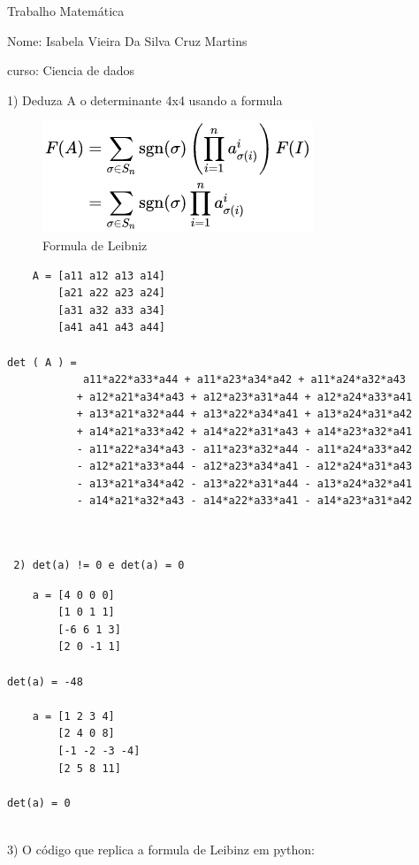 \documentclass{article}
\begin{document}
Trabalho Matemática

Nome: Isabela Vieira Da Silva Cruz Martins

curso: Ciencia de dados


1) Deduza A o determinante 4x4 usando a formula
\begin{figure}[h]
    \centering
    \includegraphics{Formula.png}
    \caption{Formula de Leibniz}
    \label{fig:exemplo}
\end{figure}

\begin{lstlisting}
    A = [a11 a12 a13 a14]
        [a21 a22 a23 a24]
        [a31 a32 a33 a34]
        [a41 a41 a43 a44]

det ( A ) =
            a11*a22*a33*a44 + a11*a23*a34*a42 + a11*a24*a32*a43
           + a12*a21*a34*a43 + a12*a23*a31*a44 + a12*a24*a33*a41
           + a13*a21*a32*a44 + a13*a22*a34*a41 + a13*a24*a31*a42
           + a14*a21*a33*a42 + a14*a22*a31*a43 + a14*a23*a32*a41
           - a11*a22*a34*a43 - a11*a23*a32*a44 - a11*a24*a33*a42
           - a12*a21*a33*a44 - a12*a23*a34*a41 - a12*a24*a31*a43
           - a13*a21*a34*a42 - a13*a22*a31*a44 - a13*a24*a32*a41
           - a14*a21*a32*a43 - a14*a22*a33*a41 - a14*a23*a31*a42
       
        
\end{lstlisting}
\begin{lstlisting}
 2) det(a) != 0 e det(a) = 0 
\end{lstlisting} 

\begin{lstlisting}
    a = [4 0 0 0]
        [1 0 1 1]
        [-6 6 1 3]
        [2 0 -1 1]

det(a) = -48

    a = [1 2 3 4]
        [2 4 0 8]
        [-1 -2 -3 -4]
        [2 5 8 11]

det(a) = 0        
        
\end{lstlisting}


3) O código que replica a formula de Leibinz em python:
\end{document}
